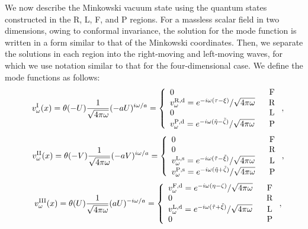 \documentclass[aps,prd,preprintnumbers,nofootinbib,showpacs,11pt]{revtex4}%
\begin{document}
\begin{widetext}
We now describe the Minkowski vacuum state 
using the quantum states constructed in the R, L, F, and 
P regions.  
For a massless scalar field in two dimensions, 
owing to conformal invariance, 
the solution for the mode function is written in a form similar to that of
the Minkowski coordinates. Then, we separate
the solutions in each region into the right-moving and left-moving waves, 
for which we use notation similar to that for the four-dimensional case. 
%
We define the mode functions as follows: 
\begin{eqnarray}
&&v_{\omega}^{\rm I}(x)= \theta(-U) {1\over {\sqrt{4\pi \omega}}} (-aU)^{i\omega/a}=
\left\{
\begin{array}{lc}
0 & ~~{\rm F}
\\
v^{{\rm R},{\rm d}}_{\omega}={e^{-i\omega(\tau-\xi)}/ \sqrt{4\pi \omega}}& ~~{\rm R}
\\
0& ~~{\rm L}
\\
v_{\omega}^{{\rm P},{\rm d}}={e^{-i\omega(\tilde\eta-\tilde\zeta)}/ \sqrt{4\pi \omega}} & ~~{\rm P}
\end{array}
\right.,
\nonumber
\end{eqnarray}
\begin{eqnarray}
&&v_{\omega}^{\rm II}(x)=\theta (-V) {1 \over \sqrt{4\pi \omega}} (-aV)^{i{\omega/ a}}=
\left\{
\begin{array}{lc}
0& ~~{\rm F}
\\
0& ~~{\rm R}
\\
v^{{\rm L},{\rm s}}_{\omega}={e^{-i\omega(\tilde\tau-\tilde\xi)}/ \sqrt{4\pi \omega}}& ~~{\rm L}
\\
v_{\omega}^{{\rm P},{\rm s}}={e^{-i\omega(\tilde\eta+\tilde\zeta)}/ \sqrt{4\pi \omega}} & ~~{\rm P}
\end{array}
\right.,
\nonumber
\end{eqnarray}
\begin{eqnarray}
&&v_{\omega}^{{\rm III}}(x)=\theta (U) {1 \over \sqrt{4\pi \omega}} (aU)^{-i{\omega / a}}=
\left\{
\begin{array}{lc}
v_{\omega}^{{\rm F},{\rm d}}={e^{-i\omega(\eta-\zeta)}/ \sqrt{4\pi \omega}} & ~~{\rm F}
\\
0& ~~{\rm R}
\\
v^{{\rm L},{\rm d}}_{\omega}={e^{-i\omega(\tilde\tau+\tilde\xi)}/ \sqrt{4\pi \omega}}& ~~{\rm L}
\\
0& ~~{\rm P}
\end{array}
\right.,
\nonumber
\end{eqnarray}
\begin{eqnarray}

\end{eqnarray}
\end{widetext}
\end{document}
